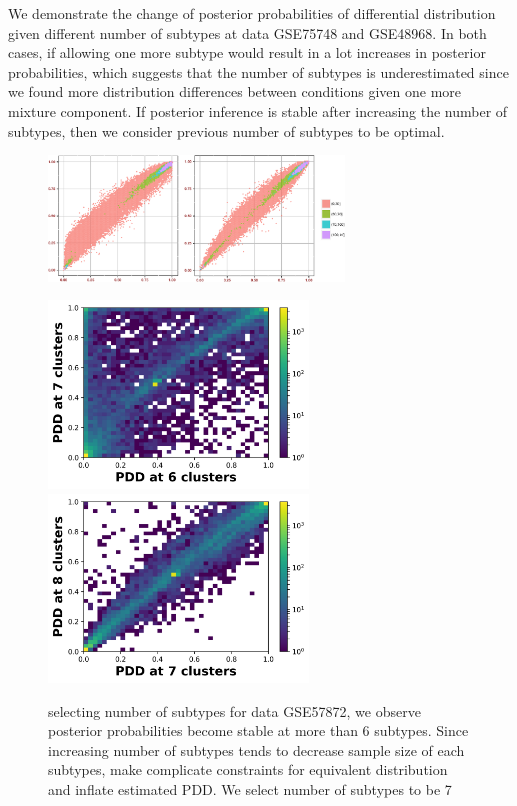 \documentclass[aoas,preprint]{imsart}
\begin{document}
We demonstrate the change of posterior probabilities of differential distribution given different number of subtypes at data GSE75748 and GSE48968. In both cases, if allowing one more subtype would result in a lot increases in posterior probabilities, which suggests that the number of subtypes is underestimated since we found more distribution differences between conditions given one more mixture component. If posterior inference is stable after increasing the number of subtypes, then we consider previous number of subtypes to be optimal. 
\begin{figure}[H]

\includegraphics[width = 0.7\textwidth]{Figs/s_78_GSE57872.pdf}



  \includegraphics[height = 5cm, width=\linewidth]{Figs/DN_67.png}
\endminipage\hfill
{}
  \includegraphics[height = 5cm, width=\linewidth]{Figs/DN_78.png}
\endminipage\hfill


\caption{selecting number of subtypes for data GSE57872, we observe posterior probabilities become stable at more than 6 subtypes. Since increasing number of subtypes tends to decrease sample size of each subtypes, make complicate constraints for equivalent distribution and inflate estimated PDD.  We select number of subtypes to be 7}
\end{figure}
\end{document}
